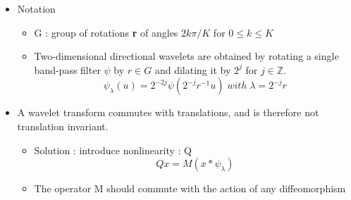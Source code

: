\documentclass{beamer}
\begin{document}
\begin{frame}
\begin{itemize}
    
    \item Notation
    \begin{itemize}
        \item G : group of rotations \textbf{r} of angles $2k\pi/K$ for $0 \leq k \leq K$
        \item Two-dimensional directional wavelets are obtained by rotating a single band-pass filter $\psi$ by $r \in G$ and dilating it by $2^{j}$ for $j \in \mathbb{Z}$.
        \begin{equation}
            \psi_{\lambda}(u) = 2^{-2j} \psi(2^{-j}r^{-1}u) \; with \; \lambda = 2^{-j}r
        \end{equation}
    \end{itemize}

	\item A wavelet transform commutes with translations, and is therefore not translation invariant.
	\begin{itemize}
	    \item Solution : introduce nonlinearity : Q 
	    \begin{equation}
	        Qx = M(x*\psi_{\lambda})
	    \end{equation}
	    \item The operator M should commute with the action of any diffeomorphism
	\end{itemize}

\end{itemize}
\end{frame}

\end{document}
